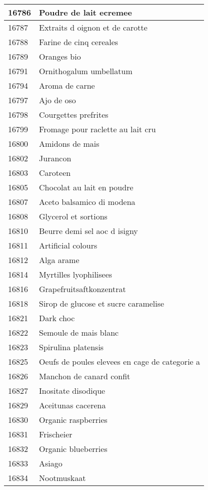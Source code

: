\begin{longtable}{|l|l|}
16786 & Poudre de lait ecremee \\ \hline 
16787 & Extraits d oignon et de carotte \\ \hline 
16788 & Farine de cinq cereales \\ \hline 
16789 & Oranges bio \\ \hline 
16791 & Ornithogalum umbellatum \\ \hline 
16794 & Aroma de carne \\ \hline 
16797 & Ajo de oso \\ \hline 
16798 & Courgettes prefrites \\ \hline 
16799 & Fromage pour raclette au lait cru \\ \hline 
16800 & Amidons de mais \\ \hline 
16802 & Jurancon \\ \hline 
16803 & Caroteen \\ \hline 
16805 & Chocolat au lait en poudre \\ \hline 
16807 & Aceto balsamico di modena \\ \hline 
16808 & Glycerol et sortions \\ \hline 
16810 & Beurre demi sel aoc d isigny \\ \hline 
16811 & Artificial colours \\ \hline 
16812 & Alga arame \\ \hline 
16814 & Myrtilles lyophilisees \\ \hline 
16816 & Grapefruitsaftkonzentrat \\ \hline 
16818 & Sirop de glucose et sucre caramelise \\ \hline 
16821 & Dark choc \\ \hline 
16822 & Semoule de mais blanc \\ \hline 
16823 & Spirulina platensis \\ \hline 
16825 & Oeufs de poules elevees en cage de categorie a \\ \hline 
16826 & Manchon de canard confit \\ \hline 
16827 & Inositate disodique \\ \hline 
16829 & Aceitunas cacerena \\ \hline 
16830 & Organic raspberries \\ \hline 
16831 & Frischeier \\ \hline 
16832 & Organic blueberries \\ \hline 
16833 & Asiago \\ \hline 
16834 & Nootmuskaat \\ \hline 

\end{longtable}
